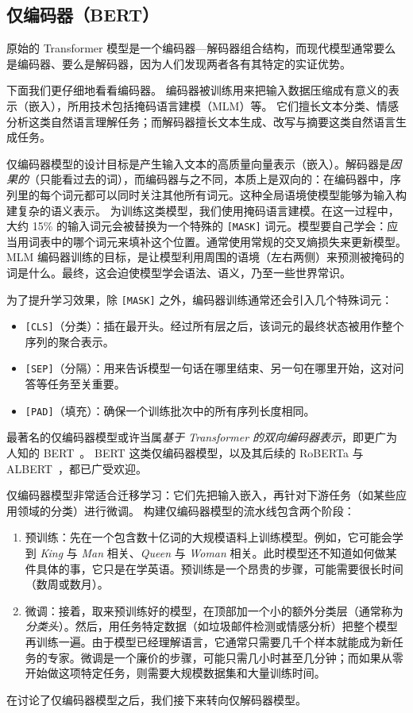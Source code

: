 \subsection{仅编码器（BERT）}
原始的 Transformer 模型是一个编码器—解码器组合结构，而现代模型通常要么是编码器、要么是解码器，因为人们发现两者各有其特定的实证优势。

下面我们更仔细地看看编码器。
编码器被训练用来把输入数据压缩成有意义的表示（嵌入），所用技术包括掩码语言建模（MLM）等。
它们擅长文本分类、情感分析这类自然语言理解任务；而解码器擅长文本生成、改写与摘要这类自然语言生成任务。

仅编码器模型的设计目标是产生输入文本的高质量向量表示（嵌入）。解码器是{\em 因果的}（只能看过去的词），而编码器与之不同，本质上是双向的：在编码器中，序列里的每个词元都可以同时关注其他所有词元。这种全局语境使模型能够为输入构建复杂的语义表示。
为训练这类模型，我们使用掩码语言建模。在这一过程中，大约 15\% 的输入词元会被替换为一个特殊的 \texttt{[MASK]} 词元。模型要自己学会：应当用词表中的哪个词元来填补这个位置。通常使用常规的交叉熵损失来更新模型。MLM 编码器训练的目标，是让模型利用周围的语境（左右两侧）来预测被掩码的词是什么。最终，这会迫使模型学会语法、语义，乃至一些世界常识。

为了提升学习效果，除 \texttt{[MASK]} 之外，编码器训练通常还会引入几个特殊词元：
\begin{itemize}
    \item \texttt{[CLS]}（分类）：插在最开头。经过所有层之后，该词元的最终状态被用作整个序列的聚合表示。
    \item \texttt{[SEP]}（分隔）：用来告诉模型一句话在哪里结束、另一句在哪里开始，这对问答等任务至关重要。
    \item \texttt{[PAD]}（填充）：确保一个训练批次中的所有序列长度相同。
\end{itemize}
最著名的仅编码器模型或许当属{\em 基于 Transformer 的双向编码器表示}，即更广为人知的 BERT~\citep{devlin2018bert}。
BERT 这类仅编码器模型，以及其后续的 RoBERTa \citep{liu2019roberta} 与 ALBERT~\citep{lan2019albert}，都已广受欢迎。

仅编码器模型非常适合迁移学习：它们先把输入嵌入，再针对下游任务（如某些应用领域的分类）进行微调。
构建仅编码器模型的流水线包含两个阶段：
\begin{enumerate}
    \item 预训练：先在一个包含数十亿词的大规模语料上训练模型。例如，它可能会学到 \textit{King} 与 \textit{Man} 相关、\textit{Queen} 与 \textit{Woman} 相关。此时模型还不知道如何做某件具体的事，它只是在学英语。预训练是一个昂贵的步骤，可能需要很长时间（数周或数月）。
    \item 微调：接着，取来预训练好的模型，在顶部加一个小的额外分类层（通常称为\textit{分类头}）。然后，用任务特定数据（如垃圾邮件检测或情感分析）把整个模型再训练一遍。由于模型已经理解语言，它通常只需要几千个样本就能成为新任务的专家。微调是一个廉价的步骤，可能只需几小时甚至几分钟；而如果从零开始做这项特定任务，则需要大规模数据集和大量训练时间。
\end{enumerate}
在讨论了仅编码器模型之后，我们接下来转向仅解码器模型。

